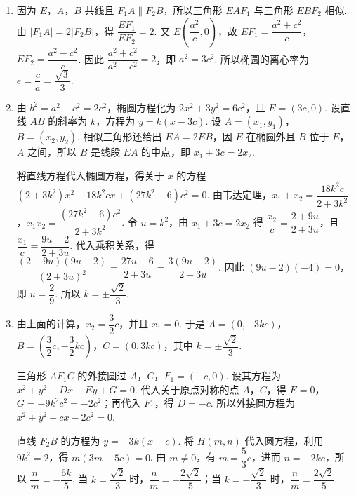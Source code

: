 \begin{solution}
\begin{enumerate}
\item 因为 \(E\)，\(A\)，\(B\) 共线且 \(F_1A\parallel F_2B\)，所以三角形 \(EAF_1\) 与三角形 \(EBF_2\) 相似. 由 \(|F_1A|=2|F_2B|\)，得
\(\dfrac{EF_1}{EF_2}=2\). 又 \(E\left(\dfrac{a^2}{c},0\right)\)，故 \(EF_1=\dfrac{a^2+c^2}{c}\)，\(EF_2=\dfrac{a^2-c^2}{c}\). 因此 \(\dfrac{a^2+c^2}{a^2-c^2}=2\)，即 \(a^2=3c^2\). 所以椭圆的离心率为 \(e=\dfrac ca=\dfrac{\sqrt3}{3}\).
\item 由 \(b^2=a^2-c^2=2c^2\)，椭圆方程化为 \(2x^2+3y^2=6c^2\)，且 \(E=(3c,0)\). 设直线 \(AB\) 的斜率为 \(k\)，方程为 \(y=k(x-3c)\). 设 \(A=(x_1,y_1)\)，\(B=(x_2,y_2)\). 相似三角形还给出 \(EA=2EB\)，因 \(E\) 在椭圆外且 \(B\) 位于 \(E\)，\(A\) 之间，所以 \(B\) 是线段 \(EA\) 的中点，即 \(x_1+3c=2x_2\).

将直线方程代入椭圆方程，得关于 \(x\) 的方程
\((2+3k^2)x^2-18k^2cx+(27k^2-6)c^2=0\).
由韦达定理，\(x_1+x_2=\dfrac{18k^2c}{2+3k^2}\)，\(x_1x_2=\dfrac{(27k^2-6)c^2}{2+3k^2}\). 令 \(u=k^2\)，由 \(x_1+3c=2x_2\) 得
\(\dfrac{x_2}{c}=\dfrac{2+9u}{2+3u}\)，且 \(\dfrac{x_1}{c}=\dfrac{9u-2}{2+3u}\). 代入乘积关系，得
\(\dfrac{(2+9u)(9u-2)}{(2+3u)^2}=\dfrac{27u-6}{2+3u}=\dfrac{3(9u-2)}{2+3u}\).
因此 \((9u-2)(-4)=0\)，即 \(u=\dfrac29\). 所以 \(k=\pm\dfrac{\sqrt2}{3}\).
\item 由上面的计算，\(x_2=\dfrac32c\)，并且 \(x_1=0\). 于是
\(A=(0,-3kc)\)，\(B=\left(\dfrac32c,-\dfrac32kc\right)\)，\(C=(0,3kc)\)，其中 \(k=\pm\dfrac{\sqrt2}{3}\).

三角形 \(AF_1C\) 的外接圆过 \(A\)，\(C\)，\(F_1=(-c,0)\). 设其方程为 \(x^2+y^2+Dx+Ey+G=0\). 代入关于原点对称的点 \(A\)，\(C\)，得 \(E=0\)，\(G=-9k^2c^2=-2c^2\)；再代入 \(F_1\)，得 \(D=-c\). 所以外接圆方程为 \(x^2+y^2-cx-2c^2=0\).

直线 \(F_2B\) 的方程为 \(y=-3k(x-c)\). 将 \(H(m,n)\) 代入圆方程，利用 \(9k^2=2\)，得 \(m(3m-5c)=0\). 由 \(m\neq0\)，有 \(m=\dfrac53c\)，进而 \(n=-2kc\)，所以 \(\dfrac nm=-\dfrac{6k}{5}\). 当 \(k=\dfrac{\sqrt2}{3}\) 时，\(\dfrac nm=-\dfrac{2\sqrt2}{5}\)；当 \(k=-\dfrac{\sqrt2}{3}\) 时，\(\dfrac nm=\dfrac{2\sqrt2}{5}\).
\end{enumerate}
\end{solution}

